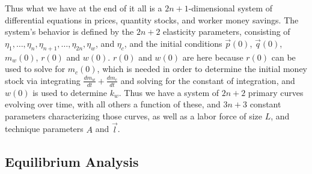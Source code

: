 \documentclass{article}
\theoremstyle{definition}
\begin{document}
Thus what we have at the end of it all is a $2n+1$-dimensional system of differential equations in prices, quantity stocks, and worker money savings. The system's behavior is defined by the $2n+2$ elasticity parameters, consisting of $\eta_1,\ldots, \eta_n,\eta_{n+1},\ldots,\eta_{2n},\eta_w$, and $\eta_c$, and the initial conditions $\vec{p}(0)$, $\vec{q}(0)$, $m_w(0)$, $r(0)$ and $w(0)$. $r(0)$ and $w(0)$ are here because $r(0)$ can be used to solve for $m_c(0)$, which is needed in order to determine the initial money stock via integrating $\frac{dm_w}{dt}+\frac{dm_c}{dt}$ and solving for the constant of integration, and $w(0)$ is used to determine $k_w$. Thus we have a system of $2n+2$ primary curves evolving over time, with all others a function of these, and $3n+3$ constant parameters characterizing those curves, as well as a labor force of size $L$, and technique parameters $A$ and $\vec{l}$. 

\subsection{Equilibrium Analysis}

 
\end{document}
